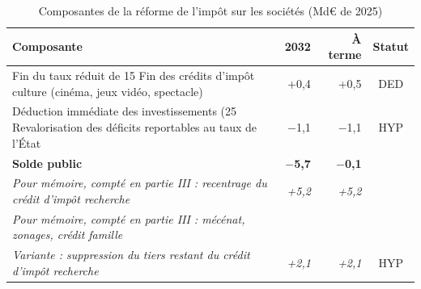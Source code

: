 \begin{table}[!htbp]\small\setlength{\tabcolsep}{4pt}
\caption{Composantes de la réforme de l'impôt sur les sociétés (Md€ de 2025)}\label{tab:t4}
\begin{tabularx}{\linewidth}{@{}Xrrc@{}}
\toprule
\textbf{Composante} & \textbf{2032} & \textbf{À terme} & \textbf{Statut} \\
\midrule
Fin du taux réduit de 15 %
Fin des crédits d'impôt culture (cinéma, jeux vidéo, spectacle) & +0,4 & +0,5 & DED \\
Déduction immédiate des investissements (25 %
Revalorisation des déficits reportables au taux de l'État & $-$1,1 & $-$1,1 & HYP \\
\midrule \textbf{Solde public} & \textbf{$-$5,7} & \textbf{$-$0,1} & \\
\midrule \emph{Pour mémoire, compté en partie III : recentrage du crédit d'impôt recherche} & \emph{+5,2} & \emph{+5,2} & \\
\emph{Pour mémoire, compté en partie III : mécénat, zonages, crédit famille} & & & \\
\emph{Variante : suppression du tiers restant du crédit d'impôt recherche} & \emph{+2,1} & \emph{+2,1} & HYP \\
\bottomrule
\end{tabularx}
\par{}
\end{table}
